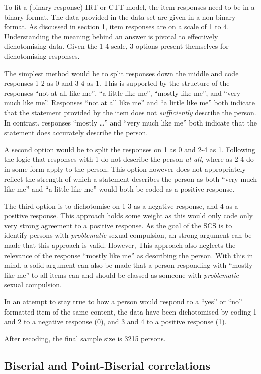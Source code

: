\documentclass[
  man,floatsintext]{apa6}
\begin{document}
To fit a (binary response) IRT or CTT model, the item responses need to be in a binary format. The data provided in the data set are given in a non-binary format. As discussed in section 1, item responses are on a scale of 1 to 4. Understanding the meaning behind an answer is pivotal to effectively dichotomising data. Given the 1-4 scale, 3 options present themselves for dichotomising responses.

The simplest method would be to split responses down the middle and code responses 1-2 as 0 and 3-4 as 1. This is supported by the structure of the responses ``not at all like me'', ``a little like me'', ``mostly like me'', and ``very much like me''. Responses ``not at all like me'' and ``a little like me'' both indicate that the statement provided by the item does not \emph{sufficiently} describe the person. In contrast, responses ``mostly \ldots{}'' and ``very much like me'' both indicate that the statement does accurately describe the person.

A second option would be to split the responses on 1 as 0 and 2-4 as 1. Following the logic that responses with 1 do not describe the person \emph{at all}, where as 2-4 do in some form apply to the person. This option however does not appropriately reflect the strength of which a statement describes the person as both ``very much like me'' and ``a little like me'' would both be coded as a positive response.

The third option is to dichotomise on 1-3 as a negative response, and 4 as a positive response. This approach holds some weight as this would only code only very strong agreement to a positive response. As the goal of the SCS is to identify persons with \emph{problematic} sexual compulsion, an strong argument can be made that this approach is valid. However, This approach also neglects the relevance of the response ``mostly like me'' as describing the person. With this in mind, a solid argument can also be made that a person responding with ``mostly like me'' to all items can and should be classed as someone with \emph{problematic} sexual compulsion.

In an attempt to stay true to how a person would respond to a ``yes'' or ``no'' formatted item of the same content, the data have been dichotomised by coding 1 and 2 to a negative response (0), and 3 and 4 to a positive response (1).

After recoding, the final sample size is 3215 persons.

\hypertarget{biserial-and-point-biserial-correlations}{%
\subsection{Biserial and Point-Biserial correlations}\label{biserial-and-point-biserial-correlations}}
\end{document}
